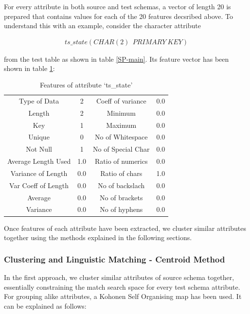 \documentclass[conference]{IEEEtran}
\begin{document}
For every attribute in both source and test schemas, a vector of length 20 is prepared that contains values for each of the 20 features decsribed above. To understand this with an example, consider the character attribute 

\noindent
\begin{align*}
ts\_state (CHAR(2)\ \ PRIMARY\ KEY)  
\end{align*}

\noindent
from the test table as shown in table \ref{SP-main}. Its feature vector has been shown in table \ref{features}:

\begin{table}[h]
\centering
\caption{Features of attribute `ts\_state'}
\begin{tabular}{|c|c|c|c|}
\hline
Type of Data & 2 & Coeff of variance & 0.0\\
Length & 2 & Minimum & 0.0\\
Key & 1 & Maximum & 0.0\\
Unique & 0 & No of Whitespace & 0.0\\
Not Null & 1 & No of Special Char & 0.0\\
Average Length Used & 1.0 & Ratio of numerics & 0.0\\
Variance of Length & 0.0 & Ratio of chars & 1.0\\	
Var Coeff of Length & 0.0 & No of backslach & 0.0\\
Average & 0.0 & No of brackets & 0.0\\
Variance & 0.0 & No of hyphens & 0.0\\
\hline
\end{tabular}
\label{features}
\end{table}

Once features of each attribute have been extracted, we cluster similar attributes together using the methods explained in the following sections.

\subsubsection*{\textbf{Clustering and Linguistic Matching - Centroid Method}}

In the first approach, we cluster similar attributes of source schema together, essentially constraining the match search space for every test schema attribute.  For grouping alike attributes, a Kohonen Self Organising map has been used. It can be explained as follows:
\end{document}
